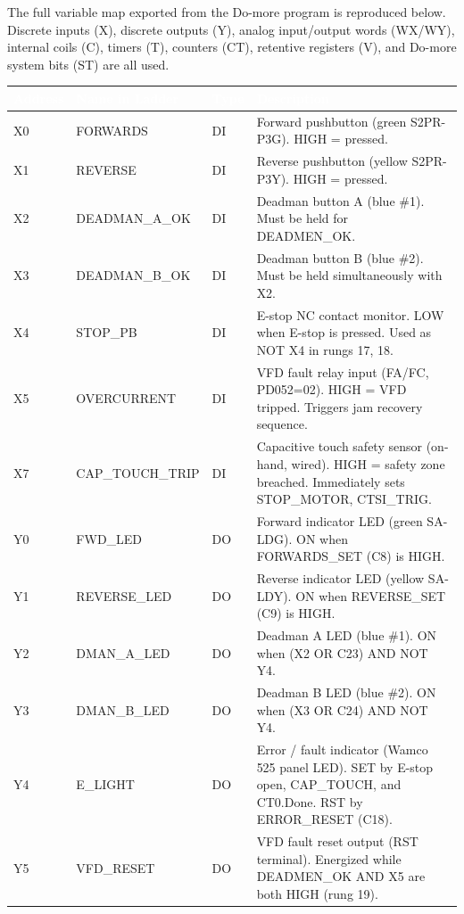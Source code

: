 \documentclass[hidelinks,12pt]{article}
\begin{document}
The full variable map exported from the Do-more program is reproduced below.
Discrete inputs (X), discrete outputs (Y), analog input/output words (WX/WY),
internal coils (C), timers (T), counters (CT), retentive registers (V), and Do-more
system bits (ST) are all used.

\noindent\begin{xltabular}{\textwidth}{|l|l|l|X|}
\hline
{}\textcolor{white}{\textbf{Address}} & \textcolor{white}{\textbf{Name in Ladder}} & \textcolor{white}{\textbf{Type}} & \textcolor{white}{\textbf{Description}} \\
\hline
X0 & FORWARDS  & DI & Forward pushbutton (green S2PR-P3G). HIGH = pressed. \\ \hline
X1 & REVERSE   & DI & Reverse pushbutton (yellow S2PR-P3Y). HIGH = pressed. \\ \hline
X2 & DEADMAN\_A\_OK & DI & Deadman button A (blue \#1). Must be held for DEADMEN\_OK. \\ \hline
X3 & DEADMAN\_B\_OK & DI & Deadman button B (blue \#2). Must be held simultaneously with X2. \\ \hline
X4 & STOP\_PB  & DI & E-stop NC contact monitor. LOW when E-stop is pressed. Used as NOT X4 in rungs 17, 18. \\ \hline
X5 & OVERCURRENT & DI & VFD fault relay input (FA/FC, PD052=02). HIGH = VFD tripped. Triggers jam recovery sequence. \\ \hline
X7 & CAP\_TOUCH\_TRIP & DI & Capacitive touch safety sensor (on-hand, wired). HIGH = safety zone breached. Immediately sets STOP\_MOTOR, CTSI\_TRIG. \\ \hline
Y0 & FWD\_LED   & DO & Forward indicator LED (green SA-LDG). ON when FORWARDS\_SET (C8) is HIGH. \\ \hline
Y1 & REVERSE\_LED & DO & Reverse indicator LED (yellow SA-LDY). ON when REVERSE\_SET (C9) is HIGH. \\ \hline
Y2 & DMAN\_A\_LED & DO & Deadman A LED (blue \#1). ON when (X2 OR C23) AND NOT Y4. \\ \hline
Y3 & DMAN\_B\_LED & DO & Deadman B LED (blue \#2). ON when (X3 OR C24) AND NOT Y4. \\ \hline
Y4 & E\_LIGHT   & DO & Error / fault indicator (Wamco 525 panel LED). SET by E-stop open, CAP\_TOUCH, and CT0.Done. RST by ERROR\_RESET (C18). \\ \hline
Y5 & VFD\_RESET & DO & VFD fault reset output (RST terminal). Energized while DEADMEN\_OK AND X5 are both HIGH (rung 19). \\ \hline

\end{xltabular}
\end{document}
